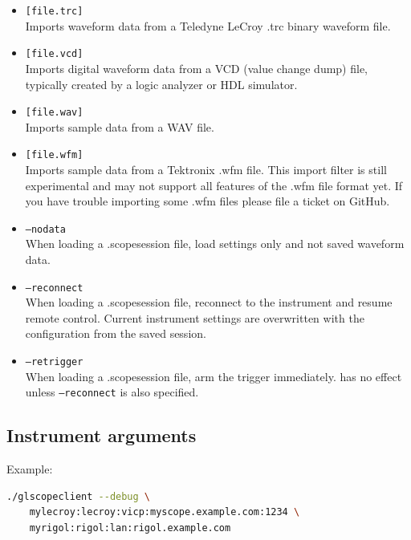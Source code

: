 \begin{itemize}
\item \texttt{[file.trc]} \\
Imports waveform data from a Teledyne LeCroy .trc binary waveform file.

\item \texttt{[file.vcd]} \\
Imports digital waveform data from a VCD (value change dump) file, typically created by a logic analyzer or HDL
simulator.

\item \texttt{[file.wav]} \\
Imports sample data from a WAV file.

\item \texttt{[file.wfm]} \\
Imports sample data from a Tektronix .wfm file. This import filter is still experimental and may not support all
features of the .wfm file format yet. If you have trouble importing some .wfm files please file a ticket on GitHub.


\item \texttt{--nodata}\\
When loading a .scopesession file, load settings only and not saved waveform data.

\item \texttt{--reconnect}\\
When loading a .scopesession file, reconnect to the instrument and resume remote control. Current instrument settings
are overwritten with the configuration from the saved session.

\item \texttt{--retrigger}\\
When loading a .scopesession file, arm the trigger immediately. has no effect unless \texttt{--reconnect} is also
specified.

\end{itemize}

\subsection{Instrument arguments}

Example:
\begin{lstlisting}[language=sh, numbers=none]
./glscopeclient --debug \
	mylecroy:lecroy:vicp:myscope.example.com:1234 \
	myrigol:rigol:lan:rigol.example.com
\end{lstlisting}

